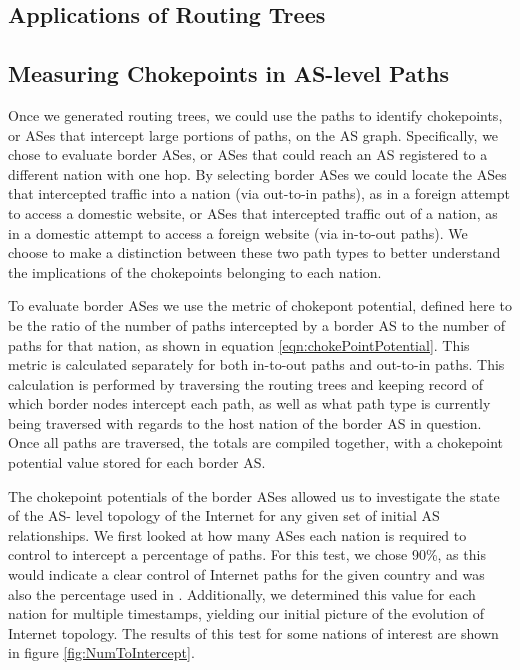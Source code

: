 \documentclass{article}
\begin{document}
\begin{multicols}{2}
\section{Applications of Routing Trees}
\subsection{Measuring Chokepoints in AS-level Paths}
Once we generated routing trees, we
could use the paths to identify chokepoints, or ASes that intercept large
portions of paths, on the AS graph. Specifically, we chose to evaluate border
ASes, or ASes that could reach an AS registered to a different nation with one
hop. By selecting border ASes we could locate the ASes that intercepted
traffic into a nation (via out-to-in paths), as in a foreign attempt to access
a domestic website, or ASes that intercepted traffic out of a nation, as in a
domestic attempt to access a foreign website (via in-to-out paths). We choose
to make a distinction between these two path types to better understand the
implications of the chokepoints belonging to each nation.
\par To evaluate border ASes we use the metric of chokepont potential, defined here to be the
ratio of the number of paths intercepted by a border AS to the number of paths
for that nation, as shown in equation \ref{eqn:chokePointPotential}. This
metric is calculated separately for both in-to-out paths and out-to-in paths.
This calculation is performed by traversing the routing trees and keeping
record of which border nodes intercept each path, as well as what path type is
currently being traversed with regards to the host nation of the border AS in
question. Once all paths are traversed, the totals are compiled together, with
a chokepoint potential value stored for each border AS.
\par 
The chokepoint potentials of the border ASes allowed us to investigate the state of the AS-
level topology of the Internet for any given set of initial AS relationships.
We first looked at how many ASes each nation is required to control to
intercept a percentage of paths. For this test, we chose 90\%, as this would
indicate a clear control of Internet paths for the given country and was also
the percentage used in \cite{throats}. Additionally, we determined this value
for each nation for multiple timestamps, yielding our initial picture of the
evolution of Internet topology. The results of this test for some nations of
interest are shown in figure \ref{fig:NumToIntercept}.


\end{multicols}
\end{document}
